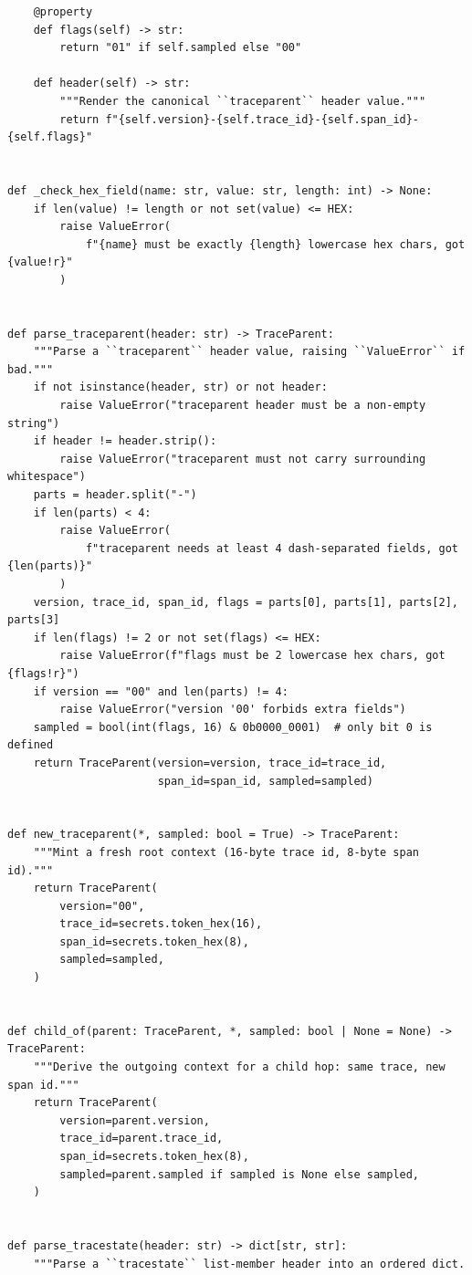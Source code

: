 \begin{verbatim}
    @property
    def flags(self) -> str:
        return "01" if self.sampled else "00"

    def header(self) -> str:
        """Render the canonical ``traceparent`` header value."""
        return f"{self.version}-{self.trace_id}-{self.span_id}-{self.flags}"


def _check_hex_field(name: str, value: str, length: int) -> None:
    if len(value) != length or not set(value) <= HEX:
        raise ValueError(
            f"{name} must be exactly {length} lowercase hex chars, got {value!r}"
        )


def parse_traceparent(header: str) -> TraceParent:
    """Parse a ``traceparent`` header value, raising ``ValueError`` if bad."""
    if not isinstance(header, str) or not header:
        raise ValueError("traceparent header must be a non-empty string")
    if header != header.strip():
        raise ValueError("traceparent must not carry surrounding whitespace")
    parts = header.split("-")
    if len(parts) < 4:
        raise ValueError(
            f"traceparent needs at least 4 dash-separated fields, got {len(parts)}"
        )
    version, trace_id, span_id, flags = parts[0], parts[1], parts[2], parts[3]
    if len(flags) != 2 or not set(flags) <= HEX:
        raise ValueError(f"flags must be 2 lowercase hex chars, got {flags!r}")
    if version == "00" and len(parts) != 4:
        raise ValueError("version '00' forbids extra fields")
    sampled = bool(int(flags, 16) & 0b0000_0001)  # only bit 0 is defined
    return TraceParent(version=version, trace_id=trace_id,
                       span_id=span_id, sampled=sampled)


def new_traceparent(*, sampled: bool = True) -> TraceParent:
    """Mint a fresh root context (16-byte trace id, 8-byte span id)."""
    return TraceParent(
        version="00",
        trace_id=secrets.token_hex(16),
        span_id=secrets.token_hex(8),
        sampled=sampled,
    )


def child_of(parent: TraceParent, *, sampled: bool | None = None) -> TraceParent:
    """Derive the outgoing context for a child hop: same trace, new span id."""
    return TraceParent(
        version=parent.version,
        trace_id=parent.trace_id,
        span_id=secrets.token_hex(8),
        sampled=parent.sampled if sampled is None else sampled,
    )


def parse_tracestate(header: str) -> dict[str, str]:
    """Parse a ``tracestate`` list-member header into an ordered dict.


\end{verbatim}
